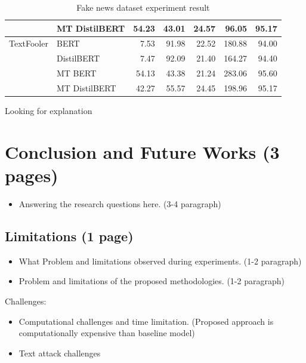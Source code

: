\documentclass[%
	BCOR=8mm, %
	DIV=12, 
	toc=bibliography, %
	toc=listof, %
	oneside, %
	egregdoesnotlikesansseriftitles, %
	]{scrbook}
\begin{document}
\begin{table}
{\begin{tabular}{llrrrrr}
           & MT DistilBERT &               54.23 &               43.01 &                24.57 &              96.05 &         95.17 \\
           \hline
TextFooler & BERT &                7.53 &               91.98 &                22.52 &             180.88 &         94.00 \\
           & DistilBERT &                7.47 &               92.09 &                21.40 &             164.27 &         94.40 \\
           & MT BERT &               54.13 &               43.38 &                21.24 &             283.06 &         95.60 \\
           & MT DistilBERT &               42.27 &               55.57 &                24.45 &             198.96 &         95.17 \\
\bottomrule
\end{tabular}
}
\caption[Experiment Result]{Fake news dataset experiment result  }
\label{table:FakeNewsExpRes}
\end{table}


Looking for explanation \cite{rogers_primer_2021}

\chapter{Conclusion and Future Works (3 pages)}
\begin{itemize}
\item Answering the research questions here. (3-4 paragraph)
\end{itemize}

\section{Limitations (1 page)}
\begin{itemize}
\item What Problem and limitations observed during experiments. (1-2 paragraph)
\item Problem and limitations of the proposed methodologies. (1-2 paragraph)
\end{itemize}
Challenges:
\begin{itemize}
\item Computational challenges and time limitation. (Proposed approach is computationally expensive than baseline model)
\item Text attack challenges
\end{itemize}
\end{document}
